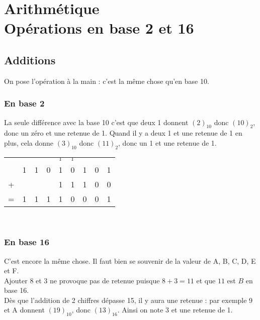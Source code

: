 \documentclass[a4paper,12pt,french]{book}
\begin{document}
\setcounter{chapter}{1}
\creativecommonsfooter

\chapter{\large Arithmétique\\[-1em]\fontsize{35pt}{42pt}\selectfont\titlefont Opérations en base 2 et 16}

\section{Additions}

On pose l'opération à la main : c'est la même chose qu'en base 10.
\subsection*{En base 2}
La seule différence avec la base 10 c'est que deux 1 donnent $(2)_{10}$ donc $(10)_2$, donc un zéro et une retenue de 1.
Quand il y a deux 1 et une retenue de 1 en plus, cela donne $(3)_{10}$ donc $(11)_2$, donc un 1 et une retenue de 1.

\begin{exemple}[]
			\begin{center}
			\begin{tabular}{ccccccccc}
 			 &   &   &  & $_1$ & $_1$ &  &  &  \\
			 & 1 & 1 & 0 & 1 & 0 & 1 & 0 & 1 \\
			+ &  &  &  & 1 & 1 & 1 & 0 & 0 \\
			\hline
			 =& 1 & 1 &  1& 1 & 0 & 0 & 0 & 1 \\
			\end{tabular} \\[2em]
			\end{center}
\end{exemple}

\subsection*{En base 16}

C'est encore la même chose. Il faut bien se souvenir de la valeur de A, B, C, D, E et F.\\
Ajouter 8 et 3 ne provoque pas de retenue puisque $8+3=11$ et que $11$ est $B$ en base 16.\\
Dès que l'addition de 2 chiffres dépasse 15, il y aura une retenue : par exemple 9 et A donnent $(19)_{10}$, donc $(13)_{16}$. Ainsi on note 3 et une retenue de 1.
\end{document}
